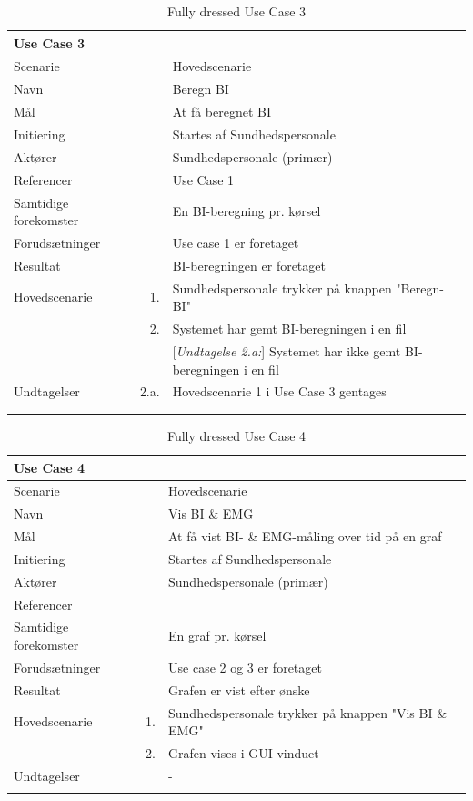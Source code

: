 \begin{longtabu} to  %
	{\large \textbf{Use Case 3}} && \\
	\toprule
	Scenarie 				&&	Hovedscenarie\\
	Navn 					&& 	Beregn BI\\
	Mål 					&& 	At få beregnet BI\\
	Initiering 				&& 	Startes af Sundhedspersonale\\
	Aktører 				&& 	Sundhedspersonale (primær)\\
	Referencer 				&& 	Use Case 1\\
	Samtidige forekomster  	&& 	En BI-beregning pr. kørsel \\
	Forudsætninger 			&&	Use case 1 er foretaget\\ 
	Resultat 				&& 	BI-beregningen er foretaget \\ \midrule
	Hovedscenarie 			&    1. 	&	Sundhedspersonale trykker på knappen "Beregn-BI"\\	
							&    2. 	& 	Systemet har gemt BI-beregningen i en fil\\
                             &&[\textit{Undtagelse 2.a:}] Systemet har ikke gemt BI-beregningen i en fil\\ \midrule
Undtagelser 			& 2.a. & Hovedscenarie 1 i Use Case 3 gentages\\  \\ \bottomrule
	
	\caption{Fully dressed Use Case 3}
	\label{UC3}
\end{longtabu}

\begin{longtabu} to  %
	{\large \textbf{Use Case 4}} && \\
	\toprule
	Scenarie 				&&	Hovedscenarie\\
	Navn 					&& 	Vis BI \& EMG\\
	Mål 					&& 	At få vist BI- \& EMG-måling over tid på en graf\\
	Initiering 				&& 	Startes af Sundhedspersonale\\
	Aktører 				&& 	Sundhedspersonale (primær)\\
	Referencer 				&& 	\\
	Samtidige forekomster  	&& 	En graf pr. kørsel \\
	Forudsætninger 			&&	Use case 2 og 3 er foretaget\\ 
	Resultat 				&& 	Grafen er vist efter ønske\\ \midrule
	Hovedscenarie 			&    1. 	&	Sundhedspersonale trykker på knappen "Vis BI \& EMG"\\				 	
							&    2. 	& 	Grafen vises i GUI-vinduet\\
	Undtagelser 			&			& 	-  \\ \bottomrule
	
	\caption{Fully dressed Use Case 4}
	\label{UC4}
\end{longtabu}

